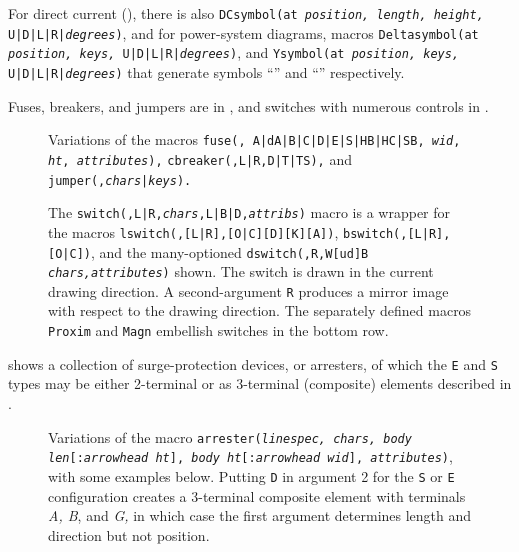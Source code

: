 \noindent
For direct current (\DCSymbol), there is also
{\tt DCsymbol(at {\sl position, length, height,} U|D|L|R|{\sl degrees})},
and for power-system diagrams, macros
{\tt Deltasymbol(at {\sl position, keys,} U|D|L|R|{\sl degrees})},
and
{\tt Ysymbol(at {\sl position, keys,} U|D|L|R|{\sl degrees})}
that generate symbols ``\DeltaSymbol'' and ``\YSymbol'' respectively.

Fuses, breakers, and jumpers are in ,
and switches with numerous controls in .
\begin{figure}[hbt]
   
   \caption{Variations of the macros
     {\tt fuse(\linespec, A|dA|B|C|D|E|S|HB|HC|SB, {\sl wid}, {\sl ht},
       {\sl attributes}),}
     {\tt cbreaker(\linespec,L|R,D|T|TS),}
     and 
     {\tt jumper(\linespec,{\sl chars}|{\sl keys}).}}
   \label{Fuses}
   \end{figure}
\begin{figure}[hbt]
   
   \caption{The
     {\tt switch(\linespec,L|R,{\sl chars},L|B|D,{\sl attribs})}
     macro is a wrapper for the macros 
     {\tt lswitch(\linespec,[L|R],[O|C][D][K][A])},
     {\tt bswitch(\linespec,[L|R],[O|C])},
     and the many-optioned
     {\tt dswitch(\linespec,R,W[ud]B {\sl chars,attributes})} shown.
     The switch is drawn in the current drawing direction.
     A second-argument {\tt R} produces a mirror
     image with respect to the drawing direction.
     The separately defined macros {\tt Proxim} and {\tt Magn}
     embellish switches in the bottom row.}
   \label{Switches}
   \end{figure}

\pagebreak
{} shows a collection of surge-protection devices, or arresters,
of which the {\tt E} and {\tt S} types may be either 2-terminal or as
3-terminal (composite) elements described in .
\begin{figure}[H]
   
   \caption{Variations of the macro {\tt arrester({\sl linespec, chars,}
     {\sl body len}[{\tt :}{\sl arrowhead ht}],
     {\sl body ht}[{\tt :}{\sl arrowhead wid}],
     {\sl attributes})}, with some examples below.
     Putting {\tt D} in argument 2 for the {\tt S} or {\tt E}
     configuration creates a 3-terminal composite element
     with terminals {\sl A, B}, and {\sl G,} in which case the first
     argument determines length and direction but not position.}
   \label{Arresters}
   \end{figure}

